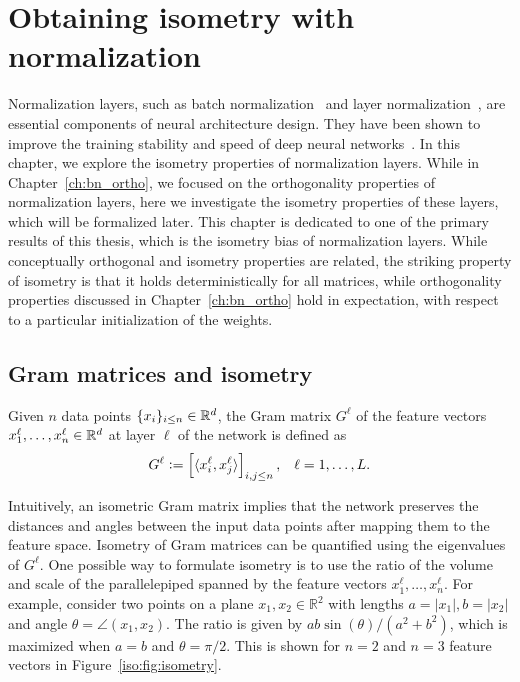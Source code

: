 \chapter{Obtaining isometry with normalization}\label{ch:isometry_normalization}

Normalization layers, such as batch normalization~\citep{ioffe2015batch} and layer normalization~\citep{ba2016layer}, are essential components of neural architecture design. They have been shown to improve the training stability and speed of deep neural networks~\citep{he2016deep, devlin2018bert}. In this chapter, we explore the isometry properties of normalization layers. While in Chapter~\ref{ch:bn_ortho}, we focused on the orthogonality properties of normalization layers, here we investigate the isometry properties of these layers, which will be formalized later. This chapter is dedicated to one of the primary results of this thesis, which is the isometry bias of normalization layers. While conceptually orthogonal and isometry properties are related, the striking property of isometry is that it holds deterministically for all matrices, while orthogonality properties discussed in Chapter~\ref{ch:bn_ortho} hold in expectation, with respect to a particular initialization of the weights. 


\section{Gram matrices and isometry}
Given $n$ data points $\{x_i\}_{i\le n}\in \mathbb{R}^d$, the Gram matrix $G^\ell$ of the feature vectors $x_1^\ell,\dots,x_n^\ell \in\mathbb{R}^d$ at layer $\ell$ of the network is defined as
\begin{align}  \label{iso:eq:gram_matrix}
G^\ell := \left[\langle x^\ell_i,x_j^\ell\rangle\right]_{i,j\le n}  , && \ell=1,\dots,L.
\end{align}

Intuitively, an isometric Gram matrix implies that the network preserves the distances and angles between the input data points after mapping them to the feature space. 
Isometry of Gram matrices can be quantified using the eigenvalues of $G^\ell.$  
One possible way to formulate isometry is to use the ratio of the volume and scale of the parallelepiped spanned by the feature vectors $x_1^\ell,  \dots,x^\ell_n$. 
For example, consider two points on a plane $x_1, x_2 \in \mathbb{R}^2$ with lengths $a = |x_1|, b = |x_2|$ and angle $\theta = \angle(x_1, x_2)$. The ratio is given by $a b \sin(\theta) / (a^2 + b^2)$, which is maximized when $a=b$ and $\theta = \pi/2$. This is shown for $n=2$ and $n=3$ feature vectors in Figure~\ref{iso:fig:isometry}. 

